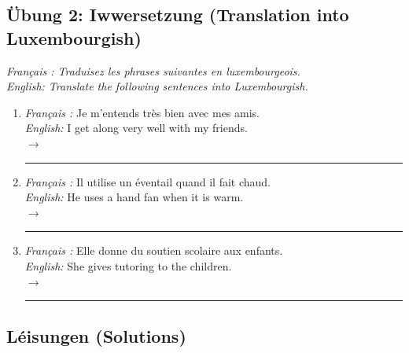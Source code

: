 \subsection*{Übung 2: Iwwersetzung (Translation into Luxembourgish)}
\textit{Français : Traduisez les phrases suivantes en luxembourgeois.}\\
\textit{English: Translate the following sentences into Luxembourgish.}

\begin{enumerate}
    \item \textit{Français :} Je m'entends très bien avec mes amis.\\
    \textit{English:} I get along very well with my friends.\\
    $\rightarrow$ \rule{8cm}{0.4pt}

    \vspace{0.6em}

    \item \textit{Français :} Il utilise un éventail quand il fait chaud.\\
    \textit{English:} He uses a hand fan when it is warm.\\
    $\rightarrow$ \rule{8cm}{0.4pt}

    \vspace{0.6em}

    \item \textit{Français :} Elle donne du soutien scolaire aux enfants.\\
    \textit{English:} She gives tutoring to the children.\\
    $\rightarrow$ \rule{8cm}{0.4pt}
\end{enumerate}

\vspace{1.5em}

\subsection*{Léisungen (Solutions)}

